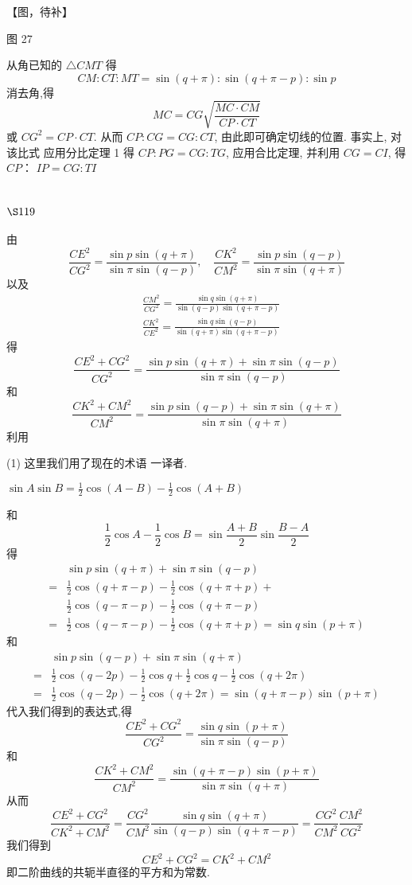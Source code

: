 【图，待补】

图 27

从角已知的 $\triangle C M T$ 得
\[
C M: C T: M T=\sin (q+\pi): \sin (q+\pi-p): \sin p
\]
消去角,得
\[
M C=C G \sqrt{\frac{M C \cdot C M}{C P \cdot C T}}
\]
或 $C G^{2}=C P \cdot C T$. 从而 $C P: C G=C G: C T$, 由此即可确定切线的位置. 事实上, 对该比式 应用分比定理 1 得 $C P: P G=C G: T G$, 应用合比定理, 并利用 $C G=C I$, 得 $C P ：$ $I P=C G: T I$

\section{$\S 119$}

由
\[
\frac{C E^{2}}{C G^{2}}=\frac{\sin p \sin (q+\pi)}{\sin \pi \sin (q-p)}, \quad \frac{C K^{2}}{C M^{2}}=\frac{\sin p \sin (q-p)}{\sin \pi \sin (q+\pi)}
\]
以及
\[
\begin{aligned}
& \frac{C M^{2}}{C G^{2}}=\frac{\sin q \sin (q+\pi)}{\sin (q-p) \sin (q+\pi-p)} \\
& \frac{C K^{2}}{C E^{2}}=\frac{\sin q \sin (q-p)}{\sin (q+\pi) \sin (q+\pi-p)}
\end{aligned}
\]
得
\[
\frac{C E^{2}+C G^{2}}{C G^{2}}=\frac{\sin p \sin (q+\pi)+\sin \pi \sin (q-p)}{\sin \pi \sin (q-p)}
\]
和
\[
\frac{C K^{2}+C M^{2}}{C M^{2}}=\frac{\sin p \sin (q-p)+\sin \pi \sin (q+\pi)}{\sin \pi \sin (q+\pi)}
\]
利用

(1) 这里我们用了现在的术语 一译者. 

$\sin A \sin B=\frac{1}{2} \cos (A-B)-\frac{1}{2} \cos (A+B)$

和
\[
\frac{1}{2} \cos A-\frac{1}{2} \cos B=\sin \frac{A+B}{2} \sin \frac{B-A}{2}
\]
得
\[
\begin{aligned}
& \sin p \sin (q+\pi)+\sin \pi \sin (q-p) \\
= & \frac{1}{2} \cos (q+\pi-p)-\frac{1}{2} \cos (q+\pi+p)+ \\
& \frac{1}{2} \cos (q-\pi-p)-\frac{1}{2} \cos (q+\pi-p) \\
= & \frac{1}{2} \cos (q-\pi-p)-\frac{1}{2} \cos (q+\pi+p)=\sin q \sin (p+\pi)
\end{aligned}
\]
和
\[
\begin{aligned}
& \sin p \sin (q-p)+\sin \pi \sin (q+\pi) \\
= & \frac{1}{2} \cos (q-2 p)-\frac{1}{2} \cos q+\frac{1}{2} \cos q-\frac{1}{2} \cos (q+2 \pi) \\
= & \frac{1}{2} \cos (q-2 p)-\frac{1}{2} \cos (q+2 \pi)=\sin (q+\pi-p) \sin (p+\pi)
\end{aligned}
\]
代入我们得到的表达式,得
\[
\frac{C E^{2}+C G^{2}}{C G^{2}}=\frac{\sin q \sin (p+\pi)}{\sin \pi \sin (q-p)}
\]
和
\[
\frac{C K^{2}+C M^{2}}{C M^{2}}=\frac{\sin (q+\pi-p) \sin (p+\pi)}{\sin \pi \sin (q+\pi)}
\]
从而
\[
\frac{C E^{2}+C G^{2}}{C K^{2}+C M^{2}}=\frac{C G^{2}}{C M^{2}} \frac{\sin q \sin (q+\pi)}{\sin (q-p) \sin (q+\pi-p)}=\frac{C G^{2}}{C M^{2}} \frac{C M^{2}}{C G^{2}}
\]
我们得到
\[
C E^{2}+C G^{2}=C K^{2}+C M^{2}
\]
即二阶曲线的共轭半直径的平方和为常数.

